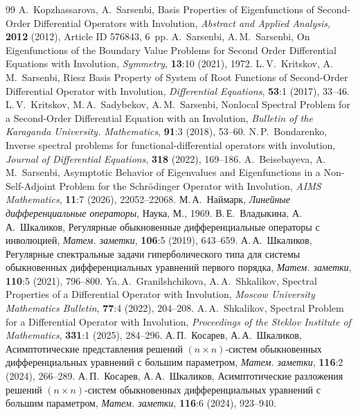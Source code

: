\documentclass[12pt,a4paper]{article}
\numberwithin{equation}{section}
\theoremstyle{definition}
\begin{document}
\begin{thebibliography}{99}
 A.~Kopzhassarova, A.~Sarsenbi, Basis Properties of Eigenfunctions of
Second-Order Differential Operators with Involution, \emph{Abstract and Applied Analysis},
\textbf{2012} (2012), Article ID 576843, 6~pp.
 A.~Sarsenbi, A.\,M.~Sarsenbi, On Eigenfunctions of the Boundary Value Problems
for Second Order Differential Equations with Involution, \emph{Symmetry}, \textbf{13}:10
(2021), 1972.
 L.\,V.~Kritskov, A.\,M.~Sarsenbi, Riesz Basis Property of System of Root
Functions of Second-Order Differential Operator with Involution, \emph{Differential Equations},
\textbf{53}:1 (2017), 33--46.
 L.\,V.~Kritskov, M.\,A.~Sadybekov, A.\,M.~Sarsenbi, Nonlocal Spectral Problem
for a Second-Order Differential Equation with an Involution, \emph{Bulletin of the Karaganda
University. Mathematics}, \textbf{91}:3 (2018), 53--60.
 N.\,P.~Bondarenko, Inverse spectral problems for functional-differential
operators with involution, \emph{Journal of Differential Equations}, \textbf{318} (2022),
169--186.
 A.~Beisebayeva, A.\,M.~Sarsenbi, Asymptotic Behavior of Eigenvalues and
Eigenfunctions in a Non-Self-Adjoint Problem for the Schr\"odinger Operator with Involution,
\emph{AIMS Mathematics}, \textbf{11}:7 (2026), 22052--22068.
 М.\,А.~Наймарк, \emph{Линейные дифференциальные операторы}, Наука, М., 1969.
 В.\,Е.~Владыкина, А.\,А.~Шкаликов, Регулярные обыкновенные дифференциальные
операторы с инволюцией, \emph{Матем. заметки}, \textbf{106}:5 (2019), 643--659.
 А.\,А.~Шкаликов, Регулярные спектральные задачи гиперболического типа для системы
обыкновенных дифференциальных уравнений первого порядка, \emph{Матем. заметки}, \textbf{110}:5
(2021), 796--800.
 Ya.\,A.~Granilshchikova, A.\,A.~Shkalikov, Spectral Properties of a
Differential Operator with Involution, \emph{Moscow University Mathematics Bulletin},
\textbf{77}:4 (2022), 204--208.
 A.\,A.~Shkalikov, Spectral Problem for a Differential Operator with
Involution, \emph{Proceedings of the Steklov Institute of Mathematics},
\textbf{331}:1 (2025), 284--296.
 А.\,П.~Косарев, А.\,А.~Шкаликов, Асимптотические представления решений
$(n\times n)$-систем обыкновенных дифференциальных уравнений с большим параметром,
\emph{Матем. заметки}, \textbf{116}:2 (2024), 266--289.
 А.\,П.~Косарев, А.\,А.~Шкаликов, Асимптотические разложения решений
$(n\times n)$-систем обыкновенных дифференциальных уравнений с большим параметром,
\emph{Матем. заметки}, \textbf{116}:6 (2024), 923--940.
\end{thebibliography}
\end{document}
